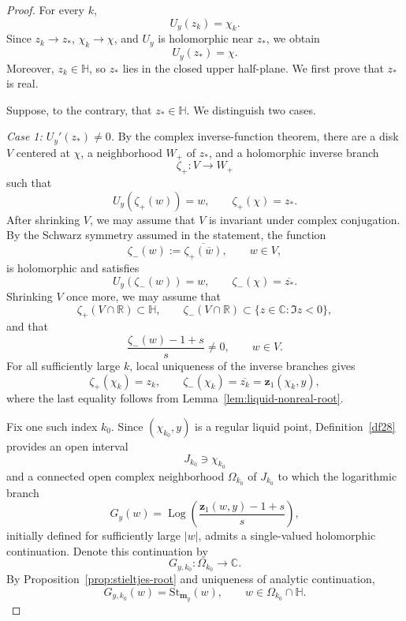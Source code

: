 \documentclass[11pt]{amsart}
\theoremstyle{plain}
\numberwithin{equation}{section}
\numberwithin{theorem}{section}
\numberwithin{figure}{section}
\begin{document}
\begin{proof}
For every \(k\),
\[
    U_y(z_k)=\chi_k.
\]
Since \(z_k\to z_*\), \(\chi_k\to\chi\), and \(U_y\) is holomorphic near
\(z_*\), we obtain
\[
    U_y(z_*)=\chi.
\]
Moreover, \(z_k\in\mathbb H\), so \(z_*\) lies in the closed upper
half-plane. We first prove that \(z_*\) is real.

Suppose, to the contrary, that \(z_*\in\mathbb H\). We distinguish two
cases.

\medskip
\noindent\emph{Case 1: \(U_y'(z_*)\neq0\).}
By the complex inverse-function theorem, there are a disk \(V\) centered at
\(\chi\), a neighborhood \(W_+\) of \(z_*\), and a holomorphic inverse branch
\[
    \zeta_+:V\longrightarrow W_+
\]
such that
\[
    U_y(\zeta_+(w))=w,
    \qquad
    \zeta_+(\chi)=z_*.
\]
After shrinking \(V\), we may assume that \(V\) is invariant under complex
conjugation. By the Schwarz symmetry assumed in the statement, the function
\[
    \zeta_-(w):=\overline{\zeta_+(\overline w)},
    \qquad w\in V,
\]
is holomorphic and satisfies
\[
    U_y(\zeta_-(w))=w,
    \qquad
    \zeta_-(\chi)=\overline{z_*}.
\]
Shrinking \(V\) once more, we may assume that
\[
    \zeta_+(V\cap\mathbb R)\subset\mathbb H,
    \qquad
    \zeta_-(V\cap\mathbb R)
    \subset\{z\in\mathbb C:\Im z<0\},
\]
and that
\[
    \frac{\zeta_-(w)-1+s}{s}\neq0,
    \qquad w\in V.
\]
For all sufficiently large \(k\), local uniqueness of the inverse branches
gives
\[
    \zeta_+(\chi_k)=z_k,
    \qquad
    \zeta_-(\chi_k)=\overline{z_k}
    =\mathbf z_1(\chi_k,y),
\]
where the last equality follows from
Lemma~\ref{lem:liquid-nonreal-root}.

Fix one such index \(k_0\). Since \((\chi_{k_0},y)\) is a regular liquid
point, Definition~\ref{df28} provides an open interval
\[
    J_{k_0}\ni\chi_{k_0}
\]
and a connected open complex neighborhood \(\Omega_{k_0}\) of \(J_{k_0}\)
to which the logarithmic branch
\[
    G_y(w)
    =
    \operatorname{Log}\!\left(
        \frac{\mathbf z_1(w,y)-1+s}{s}
    \right),
\]
initially defined for sufficiently large \(\lvert w\rvert\), admits a
single-valued holomorphic continuation. Denote this continuation by
\[
    G_{y,k_0}:\Omega_{k_0}\longrightarrow\mathbb C.
\]
By Proposition~\ref{prop:stieltjes-root} and uniqueness of analytic
continuation,
\[
    G_{y,k_0}(w)=\mathrm{St}_{\mathbf m_y}(w),
    \qquad w\in\Omega_{k_0}\cap\mathbb H.
\]


\end{proof}
\end{document}
